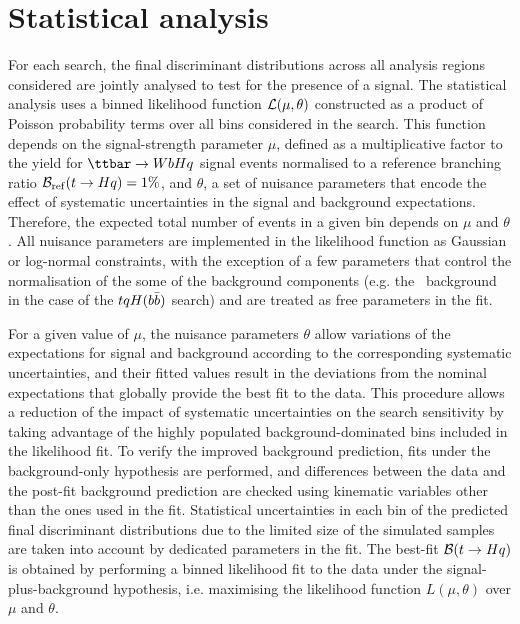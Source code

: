 \section{Statistical analysis}
\label{sec:stat_analysis}

For each search, the final discriminant distributions across all analysis regions considered are jointly analysed to test for the 
presence of a signal. The statistical analysis uses a binned likelihood function ${\cal L}(\mu,\theta)$ constructed as
a product of Poisson probability terms over all bins considered in the search. This function depends
on the signal-strength parameter $\mu$, defined as a multiplicative factor to the yield for $\Hq$ signal events
normalised to a reference branching ratio $\mathcal{B}_{\mathrm{ref}}(t\to Hq)=1\%$,
and $\theta$, a set of nuisance parameters that encode the effect of systematic uncertainties in the signal and background expectations. 
Therefore, the expected total number of events in a given bin depends on $\mu$ and $\theta$. 
All nuisance parameters are implemented in the likelihood function as Gaussian or log-normal constraints, with the exception of a few parameters 
that control the normalisation of the some of the background components (e.g. the \ttbin\ background in the case of the $tqH(b\bar{b})$ search) 
and are treated as free parameters in the fit.

For a given value of $\mu$, the nuisance parameters $\theta$ allow variations of the expectations for signal and background
according to the corresponding systematic uncertainties, and their fitted values result in the deviations from
the nominal expectations that globally provide the best fit to the data.
This procedure allows a reduction of the impact of systematic uncertainties on 
the search sensitivity by taking advantage of the highly populated background-dominated bins included in the likelihood fit.
To verify the improved background prediction, fits under the background-only hypothesis are performed, 
and differences between the data and the post-fit background prediction are checked 
using kinematic variables other than the ones used in the fit. 
Statistical uncertainties in each bin of the predicted final discriminant distributions due to the limited size of the simulated samples 
are taken into account by dedicated parameters in the fit.     
The best-fit $\mathcal{B}(t\to Hq)$ is obtained by performing a binned likelihood fit to the data under the signal-plus-background
hypothesis, i.e. maximising the likelihood function $L(\mu,\theta)$ over $\mu$ and $\theta$.

